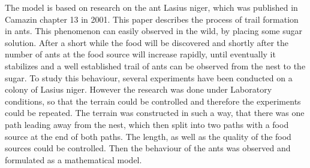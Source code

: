 The model is based on research on the ant Lasius niger, which was published in Camazin chapter 13 in 2001. This paper describes the process of trail formation in ants. This phenomenon can easily observed in the wild, by placing some sugar solution. After a short while the food will be discovered and shortly after the number of ants at the food source will increase rapidly, until eventually it stabilizes and a well established trail of ants can be observed from the nest to the sugar. To study this behaviour, several experiments have been conducted on a colony of Lasius niger. However the research was done under Laboratory conditions, so that the terrain could be controlled and therefore the experiments could be repeated. The terrain was constructed in such a way, that there was one path leading away from the nest, which then split into two paths with a food source at the end of both paths. The length, as well as the quality of the food sources could be controlled. Then the behaviour of the ants was observed and formulated as a mathematical model.
